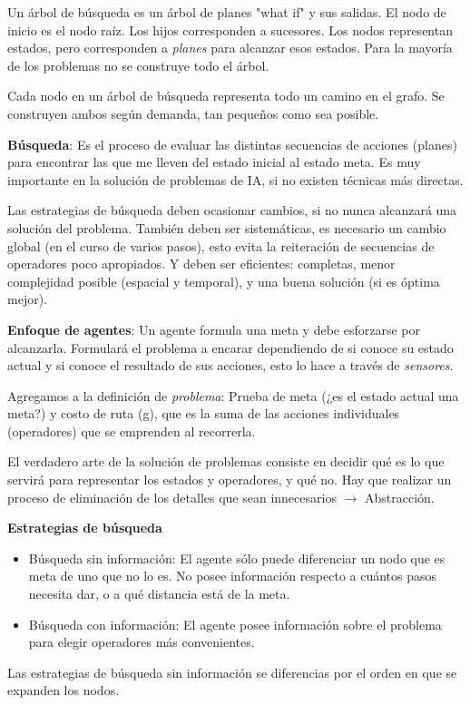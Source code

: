\documentclass[a4paper,10pt]{paper}
\begin{document}
Un árbol de búsqueda es un árbol de planes "what if" y sus salidas. El nodo de
inicio es el nodo raíz. Los hijos corresponden a sucesores. Los nodos representan
estados, pero corresponden a \textit{planes} para alcanzar esos estados. Para
la mayoría de los problemas no se construye todo el árbol.

Cada nodo en un árbol de búsqueda representa todo un camino en el grafo. Se
construyen ambos según demanda, tan pequeños como sea posible.

\textbf{Búsqueda}: Es el proceso de evaluar las distintas secuencias de acciones
(planes) para encontrar las que me lleven del estado inicial al estado meta. Es
muy importante en la solución de problemas de IA, si no existen técnicas más
directas.

Las estrategias de búsqueda deben ocasionar cambios, si no nunca alcanzará una
solución del problema. También deben ser sistemáticas, es necesario un cambio
global (en el curso de varios pasos), esto evita la reiteración de secuencias de
operadores poco apropiados. Y deben ser eficientes: completas, menor complejidad
posible (espacial y temporal), y una buena solución (si es óptima mejor).

\textbf{Enfoque de agentes}: Un agente formula una meta y debe esforzarse por
alcanzarla. Formulará el problema a encarar dependiendo de si conoce su estado
actual y si conoce el resultado de sus acciones, esto lo hace a través de
\textit{sensores}.

Agregamos a la definición de \textit{problema}: Prueba de meta (¿es el estado
actual una meta?) y costo de ruta (g), que es la suma de las acciones
individuales (operadores) que se emprenden al recorrerla.

El verdadero arte de la solución de problemas consiste en decidir qué es lo que
servirá para representar los estados y operadores, y qué no. Hay que realizar un
proceso de eliminación de los detalles que sean innecesarios $\to$ Abstracción.

\textbf{Estrategias de búsqueda}
\begin{itemize}
    \item Búsqueda sin información: El agente sólo puede diferenciar un nodo que
        es meta de uno que no lo es. No posee información respecto a cuántos pasos
        necesita dar, o a qué distancia está de la meta.
    \item Búsqueda con información: El agente posee información sobre el problema
        para elegir operadores más convenientes.
\end{itemize}
Las estrategias de búsqueda sin información se diferencias por el orden en que se
expanden los nodos.
\end{document}
